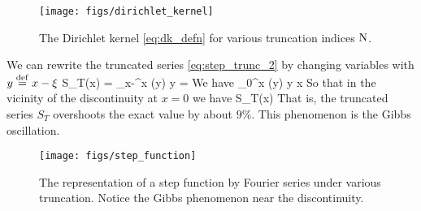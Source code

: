 \documentclass[11pt]{article}
\begin{document}
\begin{figure}[ht]
\begin{center}
    \texttt{[image: figs/dirichlet\_kernel]}
\end{center}
\caption{The Dirichlet kernel \eqref{eq:dk_defn} for various truncation indices $\mathrm{N}$.}
\label{fig:dk}
\end{figure}

We can rewrite the truncated series  \eqref{eq:step_trunc_2} by changing variables with $y\stackrel{\mathrm{def}}{=} x - \xi$
\beq
S_T(x) =  \int_{x-\pi}^x \sDN(y) \dd y =     \per
\eeq
We have
\beq
\int_0^x \sDN(y) \dd y  \pi\com\qquad {} \qquad x \qquad {}\per
\eeq
So that in the vicinity of the discontinuity at $x=0$ we have
\beq
S_T(x) \per
\eeq
That is, the truncated series $S_T$ overshoots the exact value by about $9\%$. This phenomenon is the Gibbs oscillation.

\begin{figure}[ht]
\begin{center}
    \texttt{[image: figs/step\_function]}
\end{center}
\caption{The representation of a step function by Fourier series under various truncation. Notice the Gibbs phenomenon near the discontinuity.}
\label{fig:step}
\end{figure}
\end{document}
